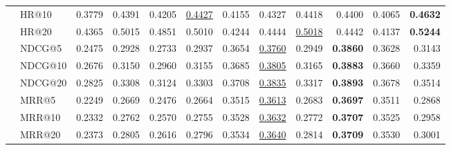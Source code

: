 \begin{tabular}{llrrrrrrrrrr}
 & HR@10 & 0.3779 & 0.4391 & 0.4205 & \underline{0.4427} & 0.4155 & 0.4327 & 0.4418 & 0.4400 & 0.4065 & \textbf{0.4632} \\
 & HR@20 & 0.4365 & 0.5015 & 0.4851 & 0.5010 & 0.4244 & 0.4444 & \underline{0.5018} & 0.4442 & 0.4137 & \textbf{0.5244} \\
 & NDCG@5 & 0.2475 & 0.2928 & 0.2733 & 0.2937 & 0.3654 & \underline{0.3760} & 0.2949 & \textbf{0.3860} & 0.3628 & 0.3143 \\
 & NDCG@10 & 0.2676 & 0.3150 & 0.2960 & 0.3155 & 0.3685 & \underline{0.3805} & 0.3165 & \textbf{0.3883} & 0.3660 & 0.3359 \\
 & NDCG@20 & 0.2825 & 0.3308 & 0.3124 & 0.3303 & 0.3708 & \underline{0.3835} & 0.3317 & \textbf{0.3893} & 0.3678 & 0.3514 \\
 & MRR@5 & 0.2249 & 0.2669 & 0.2476 & 0.2664 & 0.3515 & \underline{0.3613} & 0.2683 & \textbf{0.3697} & 0.3511 & 0.2868 \\
 & MRR@10 & 0.2332 & 0.2762 & 0.2570 & 0.2755 & 0.3528 & \underline{0.3632} & 0.2772 & \textbf{0.3707} & 0.3525 & 0.2958 \\
 & MRR@20 & 0.2373 & 0.2805 & 0.2616 & 0.2796 & 0.3534 & \underline{0.3640} & 0.2814 & \textbf{0.3709} & 0.3530 & 0.3001 \\
\hline
\end{tabular}
